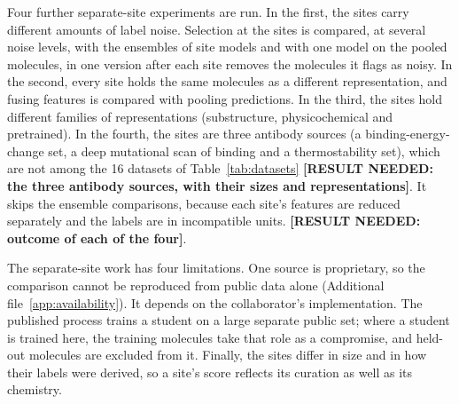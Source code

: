 Four further separate-site experiments are run. In the first, the sites carry different amounts of label noise. Selection at the sites is compared, at several noise levels, with the ensembles of site models and with one model on the pooled molecules, in one version after each site removes the molecules it flags as noisy. In the second, every site holds the same molecules as a different representation, and fusing features is compared with pooling predictions. In the third, the sites hold different families of representations (substructure, physicochemical and pretrained). In the fourth, the sites are three antibody sources (a binding-energy-change set, a deep mutational scan of binding and a thermostability set), which are not among the 16 datasets of Table~\ref{tab:datasets} \textbf{[RESULT NEEDED: the three antibody sources, with their sizes and representations]}. It skips the ensemble comparisons, because each site's features are reduced separately and the labels are in incompatible units. \textbf{[RESULT NEEDED: outcome of each of the four]}.

The separate-site work has four limitations. One source is proprietary, so the comparison cannot be reproduced from public data alone (Additional file~\ref{app:availability}). It depends on the collaborator's implementation. The published process trains a student on a large separate public set; where a student is trained here, the training molecules take that role as a compromise, and held-out molecules are excluded from it. Finally, the sites differ in size and in how their labels were derived, so a site's score reflects its curation as well as its chemistry.




